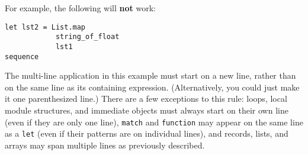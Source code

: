 \documentclass{article}
\begin{document}
\noindent For example, the following will \textbf{not} work:

\begin{verbatim}
let lst2 = List.map 
            string_of_float
            lst1
sequence
\end{verbatim}

\noindent The multi-line application in this example must start on a new line, rather than on the same line as its containing expression. (Alternatively, you could just make it one parenthesized line.) There are a few exceptions to this rule: loops, local module structures, and immediate objects must always start on their own line (even if they are only one line), {\tt match} and {\tt function} may appear on the same line as a {\tt let} (even if their patterns are on individual lines), and records, lists, and arrays may span multiple lines as previously described.
\end{document}
